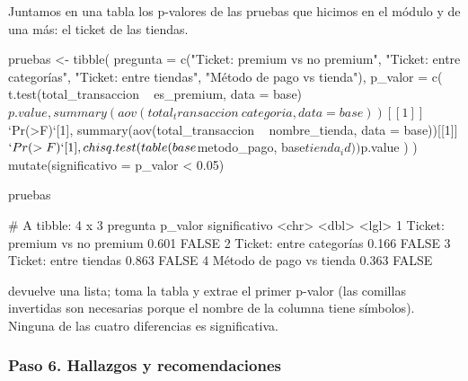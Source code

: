 Juntamos en una tabla los p-valores de las pruebas que hicimos en el módulo
y de una más: el ticket de las tiendas.

\begin{rcode}
pruebas <- tibble(
  pregunta = c("Ticket: premium vs no premium",
               "Ticket: entre categorías",
               "Ticket: entre tiendas",
               "Método de pago vs tienda"),
  p_valor = c(
    t.test(total_transaccion ~ es_premium, data = base)$p.value,
    summary(aov(total_transaccion ~ categoria,
                data = base))[[1]]$`Pr(>F)`[1],
    summary(aov(total_transaccion ~ nombre_tienda,
                data = base))[[1]]$`Pr(>F)`[1],
    chisq.test(table(base$metodo_pago, base$tienda_id))$p.value
  )
) %
  mutate(significativo = p_valor < 0.05)

pruebas
\end{rcode}
\begin{rsalida}
# A tibble: 4 x 3
  pregunta                      p_valor significativo
  <chr>                           <dbl> <lgl>
1 Ticket: premium vs no premium   0.601 FALSE
2 Ticket: entre categorías        0.166 FALSE
3 Ticket: entre tiendas           0.863 FALSE
4 Método de pago vs tienda        0.363 FALSE
\end{rsalida}

 devuelve una lista; \codigo{[[1]]} toma la tabla
y  extrae el primer p-valor (las comillas invertidas
son necesarias porque el nombre de la columna tiene símbolos). Ninguna de las
cuatro diferencias es significativa.

\subsubsection{Paso 6. Hallazgos y recomendaciones}

